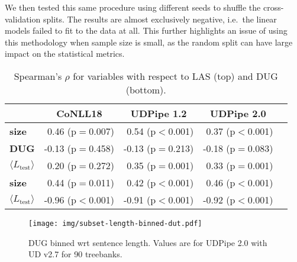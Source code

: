 \documentclass[11pt,a4paper]{article}
\newcommand{\MTL}{{$\langle L_{\textrm{test}}\rangle$}}
\begin{document}
We then tested this same procedure using different seeds
to shuffle the cross-validation splits. The results are almost exclusively negative, i.e.\ the linear models failed to fit to the data at all. This further highlights an issue of using this methodology when sample size is small, as the random split can have large impact on the statistical metrics.

\begin{table}[b!]%
    \centering
    \small
    \tabcolsep=0.05cm
    \begin{tabular}{lrrrr}
    \toprule
\multicolumn{1}{c}{} & \multicolumn{1}{c}{CoNLL18} & \multicolumn{1}{c}{UDPipe 1.2} & \multicolumn{1}{c}{UDPipe 2.0}  \\
\midrule
\textbf{size} & 0.46 (p$=$0.007) &  0.54 (p$<$0.001) &  0.37 (p$<$0.001)    \\
\textbf{DUG} & -0.13 (p$=$0.458) & -0.13 (p$=$0.213)  &  -0.18 (p$=$0.083)   \\%
\textbf{\MTL}& 0.20 (p$=$0.272) & 0.35 (p$=$0.001)  & 0.33 (p$=$0.001)  \\\midrule
\textbf{size} & 0.44 (p$=$0.011) & 0.42 (p$<$0.001) & 0.46 (p$<$0.001)& \\
\textbf{\MTL} & -0.96 (p$<$0.001) & -0.91 (p$<$0.001) & -0.92 (p$<$0.001)  \\
\bottomrule
    \end{tabular}
    \caption{Spearman's $\rho$ for variables with respect to LAS (top) and DUG (bottom).}
    \label{tab:correlations}
\end{table}
\begin{figure*}[htpb!]
    \centering
    \texttt{[image: img/subset-length-binned-dut.pdf]}
    \caption{DUG binned wrt sentence length. Values are for UDPipe 2.0 with UD v2.7 for 90 treebanks.}
    \label{fig:example_sentence_length_bins}
\end{figure*}
\end{document}
